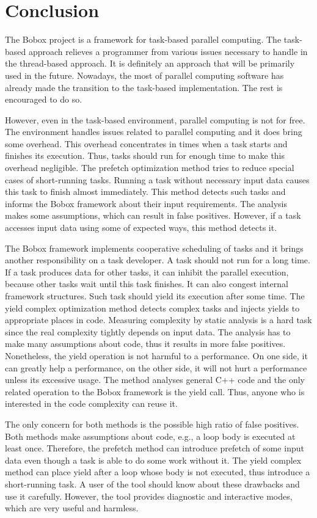 \chapter{Conclusion}
The Bobox project is a framework for task-based parallel computing. The task-based approach relieves a programmer from various issues necessary to handle in the thread-based approach. It is definitely an approach that will be primarily used in the future. Nowadays, the most of parallel computing software has already made the transition to the task-based implementation. The rest is encouraged to do so.

However, even in the task-based environment, parallel computing is not for free. The environment handles issues related to parallel computing and it does bring some overhead. This overhead concentrates in times when a task starts and finishes its execution. Thus, tasks should run for enough time to make this overhead negligible. The prefetch optimization method tries to  reduce special cases of short-running tasks. Running a task without necessary input data causes this task to finish almost immediately. This method detects such tasks and informs the Bobox framework about their input requirements. The analysis makes some assumptions, which can result in false positives. However, if a task accesses input data using some of expected ways, this method detects it.

The Bobox framework implements cooperative scheduling of tasks and it brings another responsibility on a task developer. A task should not run for a long time. If a task produces data for other tasks, it can inhibit the parallel execution, because other tasks wait until this task finishes. It can also congest internal framework structures. Such task should yield its execution after some time. The yield complex optimization method detects complex tasks and injects yields to appropriate places in code. Measuring complexity by static analysis is a hard task since the real complexity tightly depends on input data. The analysis has to make many assumptions about code, thus it results in more false positives. Nonetheless, the yield operation is not harmful to a performance. On one side, it can greatly help a performance, on the other side, it will not hurt a performance unless its excessive usage. The method analyses general C++ code and the only related operation to the Bobox framework is the yield call. Thus, anyone who is interested in the code complexity can reuse it.

The only concern for both methods is the possible high ratio of false positives. Both methods make assumptions about code, e.g., a loop body is executed at least once. Therefore, the prefetch method can introduce prefetch of some input data even though a task is able to do some work without it. The yield complex method can place yield after a loop whose body is not executed, thus introduce a short-running task. A user of the tool should know about these drawbacks and use it carefully. However, the tool provides diagnostic and interactive modes, which are very useful and harmless.